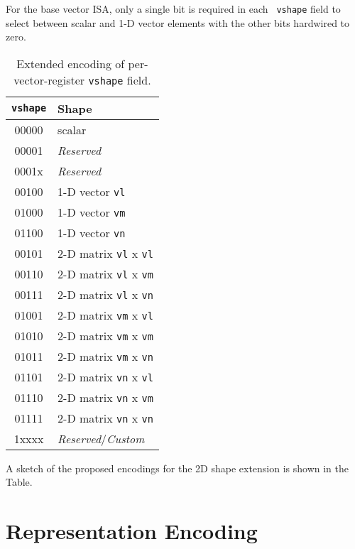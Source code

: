 \begin{commentary}
  For the base vector ISA, only a single bit is required in each {\tt
    vshape} field to select between scalar and 1-D vector elements
  with the other bits hardwired to zero.
\end{commentary}
  
\begin{table}[hbt]
  \centering
  \begin{tabular}{|c|l|}
    \hline
        {\tt vshape} & Shape \\
        \hline
        00000  & scalar \\
        00001  & {\em Reserved} \\
        0001x  & {\em Reserved} \\
        \hline
        00100  & 1-D vector {\tt vl} \\
        01000  & 1-D vector {\tt vm} \\
        01100  & 1-D vector {\tt vn} \\
        \hline
        00101  & 2-D matrix {\tt vl} x {\tt vl} \\
        00110  & 2-D matrix {\tt vl} x {\tt vm} \\
        00111  & 2-D matrix {\tt vl} x {\tt vn} \\
        \hline
        01001  & 2-D matrix {\tt vm} x {\tt vl} \\
        01010  & 2-D matrix {\tt vm} x {\tt vm} \\
        01011  & 2-D matrix {\tt vm} x {\tt vn} \\
        \hline
        01101  & 2-D matrix {\tt vn} x {\tt vl} \\
        01110  & 2-D matrix {\tt vn} x {\tt vm} \\
        01111  & 2-D matrix {\tt vn} x {\tt vn} \\
        \hline
        1xxxx  & {\em Reserved}/{\em Custom} \\
        \hline
  \end{tabular}
  \caption{Extended encoding of per-vector-register {\tt vshape} field.}
  \label{tab:extvshape}
\end{table}

\begin{commentary}
  A sketch of the proposed encodings for the 2D shape extension is
  shown in the Table.
\end{commentary}

\clearpage

\section{Representation Encoding}

